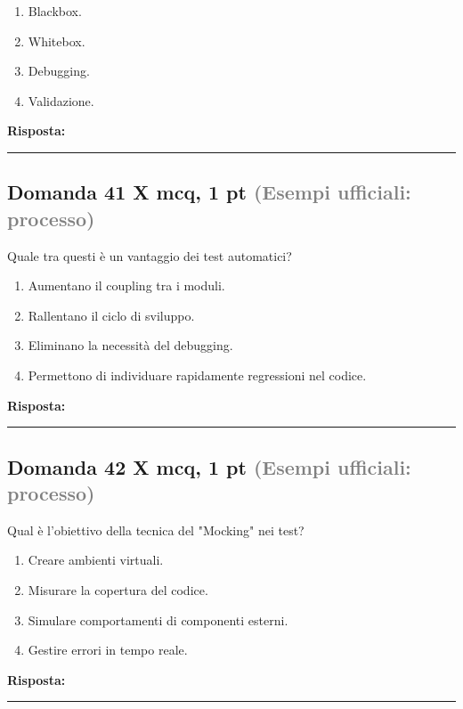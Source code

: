\documentclass[a4paper,11pt]{article}
\begin{document}
\begin{enumerate}[label=\alph*)]
\item Blackbox.
\item Whitebox.
\item Debugging.
\item Validazione.
\end{enumerate}
\vspace{0.2cm}
\noindent\textbf{Risposta:}\par
\vspace{1.5cm}\hrule


\subsection*{Domanda 41 X \hfill {\small mcq, 1 pt \textcolor{gray}{(Esempi ufficiali: processo)}}}
Quale tra questi è un vantaggio dei test automatici?

\begin{enumerate}[label=\alph*)]
\item Aumentano il coupling tra i moduli.
\item Rallentano il ciclo di sviluppo.
\item Eliminano la necessità del debugging.
\item Permettono di individuare rapidamente regressioni nel codice.
\end{enumerate}
\vspace{0.2cm}
\noindent\textbf{Risposta:}\par
\vspace{1.5cm}\hrule


\subsection*{Domanda 42 X \hfill {\small mcq, 1 pt \textcolor{gray}{(Esempi ufficiali: processo)}}}
Qual è l'obiettivo della tecnica del "Mocking" nei test?

\begin{enumerate}[label=\alph*)]
\item Creare ambienti virtuali.
\item Misurare la copertura del codice.
\item Simulare comportamenti di componenti esterni.
\item Gestire errori in tempo reale.
\end{enumerate}
\vspace{0.2cm}
\noindent\textbf{Risposta:}\par
\vspace{1.5cm}\hrule
\end{document}
